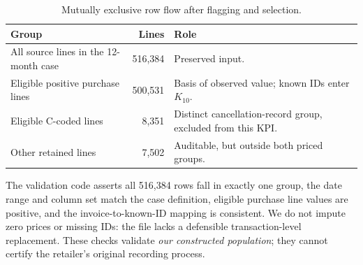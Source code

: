 \documentclass[10pt,a4paper]{article}
\begin{document}
\begin{table}[H]\centering\small
\caption{Mutually exclusive row flow after flagging and selection.}
\begin{tabularx}{\linewidth}{@{}XrX@{}}\toprule
Group & Lines & Role \\\midrule
All source lines in the 12-month case & 516,384 & Preserved input. \\
Eligible positive purchase lines & 500,531 & Basis of observed value; known IDs enter $K_{10}$. \\
Eligible C-coded lines & 8,351 & Distinct cancellation-record group, excluded from this KPI. \\
Other retained lines & 7,502 & Auditable, but outside both priced groups. \\
\bottomrule\end{tabularx}
\end{table}

The validation code asserts all 516,384 rows fall in exactly one group, the date range and column set match the case definition, eligible purchase line values are positive, and the invoice-to-known-ID mapping is consistent. We do not impute zero prices or missing IDs: the file lacks a defensible transaction-level replacement. These checks validate \emph{our constructed population}; they cannot certify the retailer's original recording process.
\end{document}
